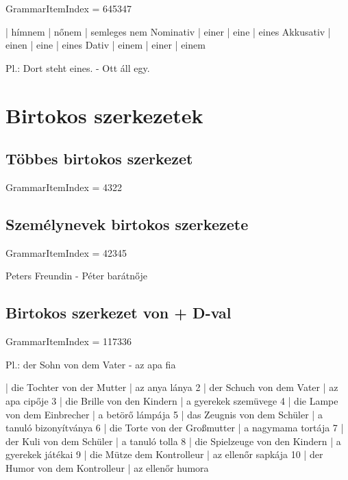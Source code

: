 \documentclass{article}
\newenvironment{desc}{\verbatim}{\endverbatim}
\newenvironment{exmp}{\verbatim}{\endverbatim}
\begin{document}
GrammarItemIndex = 645347

\begin{desc}
          | hímnem | nőnem | semleges nem 
Nominativ | einer  | eine  | eines 
Akkusativ | einen  | eine  | eines 
Dativ     | einem  | einer | einem 

Pl.: Dort steht eines. - Ott áll egy.
\end{desc}

\section{Birtokos szerkezetek}

\subsection{Többes birtokos szerkezet}

GrammarItemIndex = 4322

\subsection{Személynevek birtokos szerkezete}

GrammarItemIndex = 42345

\begin{desc}
Peters Freundin - Péter barátnője
\end{desc}

\subsection{Birtokos szerkezet von + D-val}

GrammarItemIndex = 117336

\begin{desc}
Pl.: der Sohn von dem Vater - az apa fia
\end{desc}

\begin{exmp}
1 | die Tochter von der Mutter | az anya lánya
2 | der Schuch von dem Vater | az apa cipője
3 | die Brille von den Kindern | a gyerekek szemüvege
4 | die Lampe von dem Einbrecher | a betörő lámpája
5 | das Zeugnis von dem Schüler | a tanuló bizonyítványa
6 | die Torte von der Großmutter | a nagymama tortája
7 | der Kuli von dem Schüler | a tanuló tolla
8 | die Spielzeuge von den Kindern | a gyerekek játékai
9 | die Mütze dem Kontrolleur | az ellenőr sapkája
10 | der Humor von dem Kontrolleur | az ellenőr humora
\end{exmp}
\end{document}
